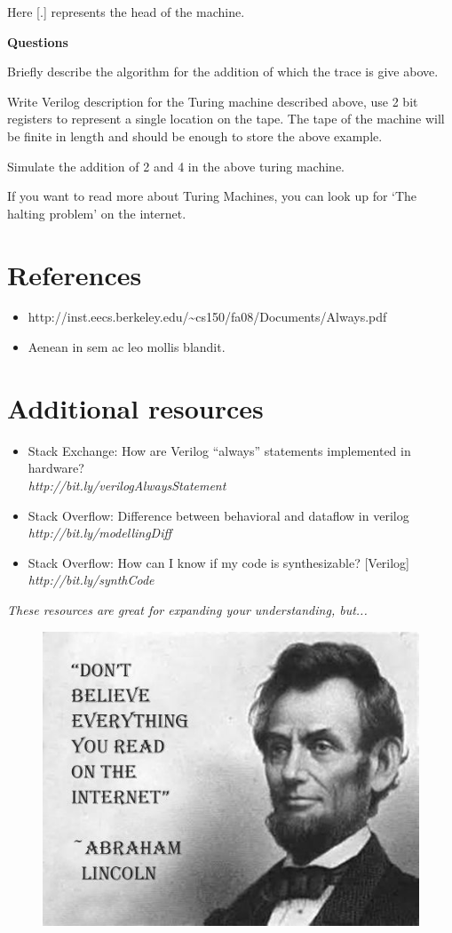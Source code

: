 \documentclass[a4paper,10pt]{article}
\theoremstyle{mytheor}
\begin{document}
{    Here \textsc{[.]} represents the head of the machine.
    
    \textbf{Questions}
    \begin{legal}
    \item Briefly describe the algorithm for the addition of which the
      trace is give above.
    \item Write Verilog description for the Turing machine described
      above, use 2 bit registers to represent a single location on the
      tape. The tape of the machine will be finite in length and
      should be enough to store the above example.
    \item Simulate the addition of 2 and 4 in the above turing
      machine.
    \end{legal}
  If you want to read more about Turing Machines, you can look up for
  `The halting problem' on the internet.
  
 }

 \pagebreak
\section*{References}
\begin{itemize}
  \small
\item
  http://inst.eecs.berkeley.edu/{\textasciitilde}cs150/fa08/Documents/Always.pdf
\item Aenean in sem ac leo mollis blandit.
\end{itemize}

\section*{Additional resources}
\begin{itemize}
  \small 
\item Stack Exchange: How are Verilog “always” statements implemented
  in hardware? \\\textit{http://bit.ly/verilogAlwaysStatement}
\item Stack Overflow: Difference between behavioral and dataflow in
  verilog \\\textit{http://bit.ly/modellingDiff}
\item Stack Overflow: How can I know if my code is synthesizable?
  [Verilog] \\\textit{http://bit.ly/synthCode}
\end{itemize} 

\centerline{\textit{These resources are great for expanding your
    understanding, but...}}
\begin{centering}
  \begin{figure}[!h] \centering  
    \includegraphics[width=0.5\linewidth]{./resources/meme.jpeg} 
  \end{figure}  
\end{centering}
\end{document}
